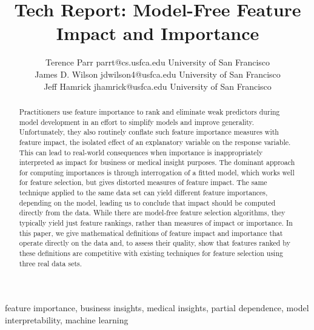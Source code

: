 \documentclass[11pt]{article}
\newcommand{\todo}[1]{{{\small\color{red}{[#1]}}}}
\begin{document}
\def\spacingset#1{\renewcommand{\baselinestretch}%
{#1}\small\normalsize} \spacingset{1}



\title{\bf Tech Report: Model-Free Feature Impact and Importance}

\author{Terence Parr \email parrt@cs.usfca.edu
\addr University of San Francisco\\
\AND James D. Wilson \email jdwilson4@usfca.edu
\addr University of San Francisco\\
\AND Jeff Hamrick \email jhamrick@usfca.edu
      \addr University of San Francisco}

\maketitle

\begin{abstract}%
Practitioners use feature importance to rank and eliminate weak predictors during model development in an effort to simplify models and improve generality.  Unfortunately, they also routinely conflate such feature importance measures with feature impact, the isolated effect of an explanatory variable on the response variable.   This can lead to real-world consequences when importance is inappropriately interpreted as impact for business or medical insight purposes. The dominant approach for computing importances is through interrogation of a fitted model, which works well for feature selection, but gives distorted measures of feature impact. The same technique applied to the same data set can yield different feature importances, depending on the model, leading us to conclude that impact should be computed directly from the data.  While there are model-free feature selection algorithms, they typically yield just feature rankings, rather than measures of impact or importance. In this paper, we give mathematical definitions of feature impact and importance that operate directly on the data and, to assess their quality, show that features ranked by these definitions are competitive with existing techniques for feature selection using three real data sets. \todo{should we reference shap, permutation importance, mRMR in abstract?}
\end{abstract}

\begin{keywords}
feature importance, business insights, medical insights, partial dependence, model interpretability, machine learning
\end{keywords}
\end{document}
